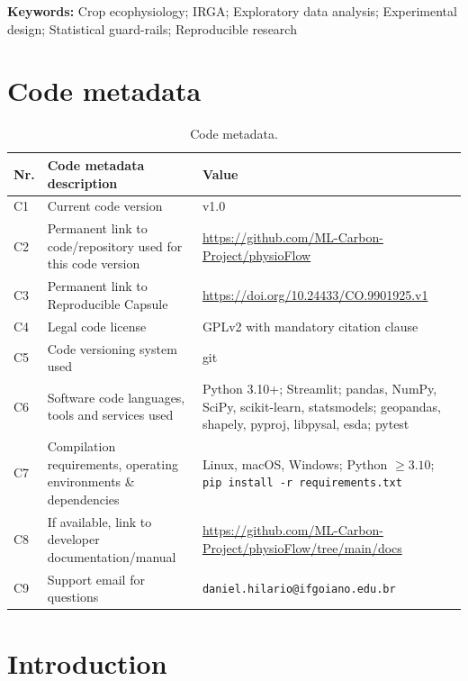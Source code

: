 \documentclass[11pt, letterpaper]{article}
\begin{document}
\vspace{0.5em}
\noindent\textbf{Keywords:} Crop ecophysiology; IRGA; Exploratory data analysis; Experimental design; Statistical guard-rails; Reproducible research
\vspace{0.5em}

\section*{Code metadata}

\begin{table}[htbp]
\centering
\footnotesize
\begin{tabular}{|l|p{4.7cm}|p{6.3cm}|}
\hline
\textbf{Nr.} & \textbf{Code metadata description} & \textbf{Value} \\
\hline
C1 & Current code version & v1.0 \\
\hline
C2 & Permanent link to code/repository used for this code version & \url{https://github.com/ML-Carbon-Project/physioFlow} \\
\hline
C3 & Permanent link to Reproducible Capsule & \url{https://doi.org/10.24433/CO.9901925.v1} \\
\hline
C4 & Legal code license & GPLv2 with mandatory citation clause \\
\hline
C5 & Code versioning system used & git \\
\hline
C6 & Software code languages, tools and services used & Python 3.10+; Streamlit; pandas, NumPy, SciPy, scikit-learn, statsmodels; geopandas, shapely, pyproj, libpysal, esda; pytest \\
\hline
C7 & Compilation requirements, operating environments \& dependencies & Linux, macOS, Windows; Python $\geq 3.10$; \texttt{pip install -r requirements.txt} \\
\hline
C8 & If available, link to developer documentation/manual & \url{https://github.com/ML-Carbon-Project/physioFlow/tree/main/docs} \\
\hline
C9 & Support email for questions & \texttt{daniel.hilario@ifgoiano.edu.br} \\
\hline
\end{tabular}
\caption{Code metadata.}
\label{tbl:metadata}
\end{table}

\section{Introduction}\label{sec:intro}
\end{document}
